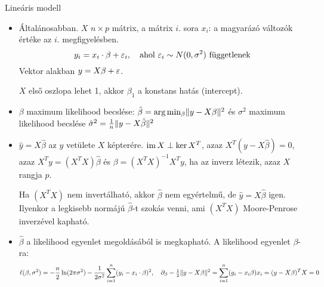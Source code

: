 \documentclass[aspectratio=169,notheorems,9pt,\option]{beamer}\usepackage[]{graphicx}\usepackage[]{color}
\begin{document}
\begin{frame}{Lineáris modell}
  \begin{itemize}
    \item Általánosabban. $X$ $n\times p$ mátrix, a mátrix $i$. sora $x_i$: a magyarázó változók 
    értéke az $i$. megfigyelésben.
    \begin{displaymath}
      y_i=x_i\cdot\beta+\varepsilon_i,\quad\text{ahol $\varepsilon_i\sim N(0,\sigma^2)$ függetlenek}
    \end{displaymath}
    Vektor alakban $y=X\beta+\varepsilon$.
    
    $X$ első oszlopa lehet 1, akkor $\beta_1$ a konstans hatás (intercept).
    
    \item $\beta$ maximum likelihood becslése: 
    $\hat\beta=\arg\min_\beta\lVert y-X\beta\rVert^2$ és $\sigma^2$ maximum likelihood becslése 
    $\hat\sigma^2=\frac1n\lVert y-X\hat\beta\rVert^2$
    \item $\hat y=X\hat\beta$ az $y$ vetülete $X$ képterére. $\operatorname{im} X\perp \ker X^T$, azaz $X^T(y-X\hat\beta)=0$, azaz 
    $X^Ty=(X^TX)\hat\beta$ és $\beta= (X^TX)^{-1}X^Ty$, ha az inverz létezik, azaz $X$ rangja $p$.
    
    
    Ha $(X^TX)$ nem invertálható, akkor $\hat\beta$ nem egyértelmű, de $\hat y=X\hat\beta$  igen. Ilyenkor
    a legkisebb normájú $\hat\beta$-t szokás venni, ami $(X^TX)$ Moore-Penrose inverzével kapható.
    
    \item $\hat\beta$ a likelihood egyenlet megoldásából is megkapható.
    A likelihood egyenlet $\beta$-ra:
    \begin{displaymath}
      \ell(\beta,\sigma^2)=-\frac{n}{2}\ln(2\pi\sigma^2)-\frac1{2\sigma^2}\sum_{i=1}^n(y_i-x_i\cdot \beta)^2,
      \quad
      \partial_{\beta} -\tfrac12\lVert y-X\beta\rVert^2 = \sum_{i=1}^n (y_i-x_i\beta)x_i = (y-X\beta)^T X =0  
    \end{displaymath}
  \end{itemize}
\end{frame}
\end{document}
